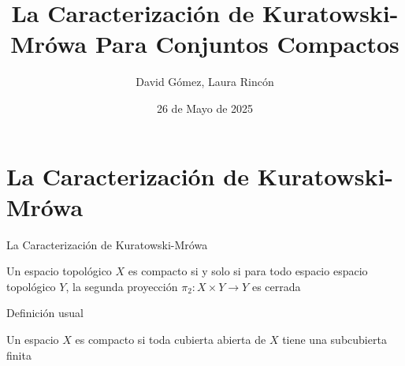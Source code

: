 \documentclass[10pt]{beamer}
\title{La Caracterización de Kuratowski-Mrówa Para Conjuntos Compactos}
\author[David G., Laura R.]{David Gómez, Laura Rincón}
\date[26/05/2025]{26 de Mayo de 2025}
\begin{document}
  \begin{frame}
    \titlepage
  \end{frame}

  \section{La Caracterización de Kuratowski-Mrówa}
  \begin{frame}{La Caracterización de Kuratowski-Mrówa}
      \begin{definition}
      Un espacio topológico $X$ es compacto si y solo si para todo espacio
      espacio topológico $Y$, la segunda proyección $\pi_2: X\times Y \longrightarrow Y$
      es cerrada 
    \end{definition}
  \end{frame}
  \begin{frame}{Definición usual}
    \begin{theorem}
      Un espacio $X$ es compacto si toda cubierta abierta de $X$
      tiene una subcubierta finita
    \end{theorem}
  \end{frame}
\end{document}
